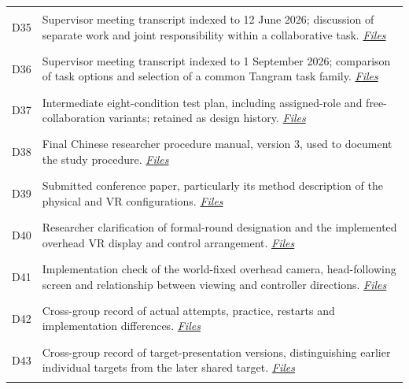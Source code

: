 \begin{longtable}{@{}p{14mm}>{\raggedright\arraybackslash}p{140mm}@{}}
\hypertarget{src:D35}{}\label{src:D35}D35 & Supervisor meeting transcript indexed to 12 June 2026; discussion of separate work and joint responsibility within a collaborative task. \href{https://github.com/YiyangQin-UQ/REIT7841/blob/main/thesis/v1.1/materials/README.md\#d35}{\textit{Files}} \\
\hypertarget{src:D36}{}\label{src:D36}D36 & Supervisor meeting transcript indexed to 1 September 2026; comparison of task options and selection of a common Tangram task family. \href{https://github.com/YiyangQin-UQ/REIT7841/blob/main/thesis/v1.1/materials/README.md\#d36}{\textit{Files}} \\
\hypertarget{src:D37}{}\label{src:D37}D37 & Intermediate eight-condition test plan, including assigned-role and free-collaboration variants; retained as design history. \href{https://github.com/YiyangQin-UQ/REIT7841/blob/main/thesis/v1.1/materials/README.md\#d37}{\textit{Files}} \\
\hypertarget{src:D38}{}\label{src:D38}D38 & Final Chinese researcher procedure manual, version 3, used to document the study procedure. \href{https://github.com/YiyangQin-UQ/REIT7841/blob/main/thesis/v1.1/materials/README.md\#d38}{\textit{Files}} \\
\hypertarget{src:D39}{}\label{src:D39}D39 & Submitted conference paper, particularly its method description of the physical and VR configurations. \href{https://github.com/YiyangQin-UQ/REIT7841/blob/main/thesis/v1.1/materials/README.md\#d39}{\textit{Files}} \\
\hypertarget{src:D40}{}\label{src:D40}D40 & Researcher clarification of formal-round designation and the implemented overhead VR display and control arrangement. \href{https://github.com/YiyangQin-UQ/REIT7841/blob/main/thesis/v1.1/materials/README.md\#d40}{\textit{Files}} \\
\hypertarget{src:D41}{}\label{src:D41}D41 & Implementation check of the world-fixed overhead camera, head-following screen and relationship between viewing and controller directions. \href{https://github.com/YiyangQin-UQ/REIT7841/blob/main/thesis/v1.1/materials/README.md\#d41}{\textit{Files}} \\
\hypertarget{src:D42}{}\label{src:D42}D42 & Cross-group record of actual attempts, practice, restarts and implementation differences. \href{https://github.com/YiyangQin-UQ/REIT7841/blob/main/thesis/v1.1/materials/README.md\#d42}{\textit{Files}} \\
\hypertarget{src:D43}{}\label{src:D43}D43 & Cross-group record of target-presentation versions, distinguishing earlier individual targets from the later shared target. \href{https://github.com/YiyangQin-UQ/REIT7841/blob/main/thesis/v1.1/materials/README.md\#d43}{\textit{Files}} \\

\end{longtable}
